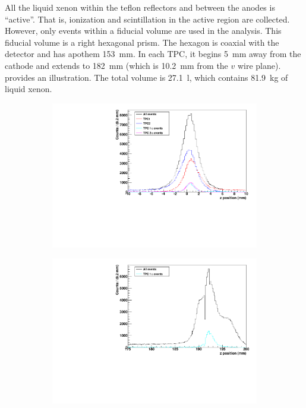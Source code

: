 \documentclass[herrin-thesis.tex]{subfiles}
\begin{document}
All the liquid xenon within the teflon reflectors and between the anodes is ``active''. That is, ionization and scintillation in the active region are collected. However, only events within a fiducial volume are used in the analysis. This fiducial volume is a right hexagonal prism. The hexagon is coaxial with the detector and has apothem \SI{153}{\mm}. In each TPC, it begins \SI{5}{\mm} away from the cathode and extends to \SI{182}{\mm} (which is \SI{10.2}{\mm} from the \(v\) wire plane).  provides an illustration. The total volume is \SI{27.1}{\litre}, which contains \SI{81.9}{\kg} of liquid xenon.

\begin{figure}[tbp]
\centering
	\begin{subfigure}[b]{0.48\textwidth}
	\centering
	\includegraphics[width=\textwidth]{./plots/analysis_fiducial_vol_bg_cathode.pdf}
\end{subfigure}\hfill%
\begin{subfigure}[b]{0.48\textwidth}
	\centering
	\includegraphics[width=1\textwidth]{./plots/analysis_fiducial_vol_bg_anode.pdf}

\end{subfigure}
\end{figure}
\end{document}
